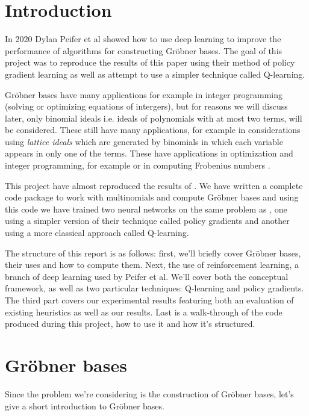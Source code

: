 \documentclass{article}
\theoremstyle{changedot}
\theoremstyle{changedotbreak}
\theoremstyle{nonumberplain}
\begin{document}
\newpage

\tableofcontents

\newpage

\section{Introduction}
In 2020 Dylan Peifer et al \cite{peifer} showed how to use deep learning to improve the performance of algorithms for constructing Gröbner bases. The goal of this project was to reproduce the results of this paper using their method of policy gradient learning as well as attempt to use a simpler technique called Q-learning.

Gröbner bases have many applications for example in integer programming (solving or optimizing equations of intergers), but for reasons we will discuss later, only binomial ideals i.e. ideals of polynomials with at most two terms, will be considered. These still have many applications, for example in considerations using \emph{lattice ideals} which are generated by binomials in which each variable appears in only one of the terms. These have applications in optimization and integer programming, for example \cite{lattice} or in computing Frobenius numbers \cite{frobenius}.

This project have almost reproduced the results of \cite{peifer}. We have written a complete code package to work with multinomials and compute Gröbner bases and using this code we have trained two neural networks on the same problem as \cite{peifer}, one using a simpler version of their technique called policy gradients and another using a more classical approach called Q-learning. 

The structure of this report is as follows: first, we'll briefly cover Gröbner bases, their uses and how to compute them. Next, the use of reinforcement learning, a branch of deep learning used by Peifer et al. We'll cover both the conceptual framework, as well as two particular techniques: Q-learning and policy gradients. The third part covers our experimental results featuring both an evaluation of existing heuristics as well as our results. Last is a walk-through of the code produced during this project, how to use it and how it's structured.

\section{Gröbner bases}

Since the problem we're considering is the construction of Gröbner bases, let's give a short introduction to Gröbner bases.
\end{document}
